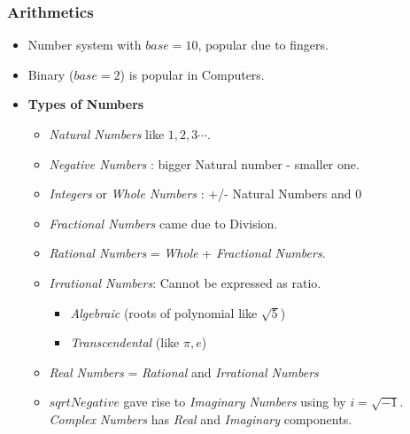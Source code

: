 \begin{frame}[fragile]
\frametitle{Arithmetics}
\begin{itemize}
\item Number system with $base = 10$, popular due to fingers. 
\item Binary ($base=2$) is popular in Computers. %
\item \textbf{Types of Numbers}
	\begin{itemize}%
	\item \textit{Natural Numbers} like $1,2,3 \cdots$.
	\item \textit{Negative Numbers} : bigger Natural number - smaller one.
	\item \textit{Integers} or \textit{Whole Numbers} : +/- Natural Numbers  and $0$
	\item \textit{Fractional Numbers} came due to Division. 
	\item \textit{Rational Numbers} = \textit{Whole} + \textit{Fractional Numbers}. 
	\item  \textit{Irrational Numbers}: Cannot be expressed as ratio. 
	\begin{itemize}
	\item \textit{Algebraic} (roots of polynomial like $\sqrt{5}$) 
	\item \textit{Transcendental} (like $\pi, e$)
	\end{itemize}
	\item \textit{Real Numbers} = \textit{Rational} and \textit{Irrational Numbers}
	\item $sqrt{Negative}$ gave rise to \textit{Imaginary Numbers} using by $i = \sqrt{-1}$. \textit{Complex Numbers} has \textit{Real} and \textit{Imaginary} components.
	\end{itemize}

\end{itemize}
\end{frame}
